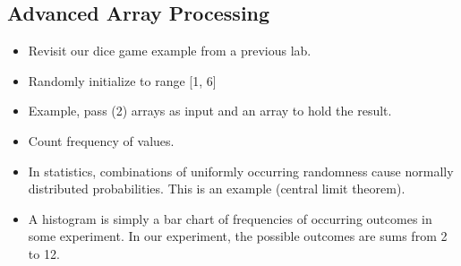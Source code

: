 \documentclass[11pt]{article}
\begin{document}
\subsection{Advanced Array Processing}
\label{sec-3-2}
\begin{itemize}
\item Revisit our dice game example from a previous lab.
\item Randomly initialize to range [1, 6]
\item Example, pass (2) arrays as input and an array to hold the result.
\item Count frequency of values.
\item In statistics, combinations of uniformly occurring randomness cause 
normally distributed probabilities.  This is an example (central limit
theorem).
\item A histogram is simply a bar chart of frequencies of occurring
outcomes in some experiment.  In our experiment, the possible
outcomes are sums from 2 to 12.
\end{itemize}
\end{document}
